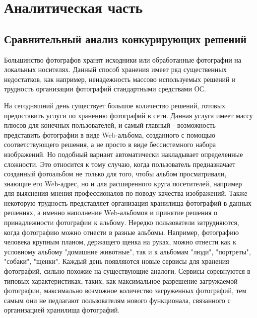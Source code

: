 \sectioncounter
\section{Аналитическая часть}\label{analytics}

\subsection{Сравнительный анализ конкурирующих решений} \label{comparsion}

Большинство фотографов хранят исходники или обработанные фотографии на локальных носителях.
Данный способ хранения имеет ряд существенных недостатков, как например, ненадежность массово используемых решений и трудность организации фотографий стандартными средствами ОС.

На сегодняшний день существует большое количество решений, готовых предоставить услуги по хранению фотографий в сети.
Данная услуга имеет массу плюсов для конечных пользователей, и самый главный  - возможность представить фотографии в виде Web-альбома, созданного с помощью соответствующего решения, а не просто в виде бессистемного набора изображений.
Но подобный вариант автоматически накладывает определенные сложности. 
Это относится к тому случаю, когда пользователь предназначает созданный фотоальбом не только для того, чтобы альбом просматривали, знающие его Web-адрес, но и для расширенного круга посетителей, например для выяснения мнения профессионалов по поводу качества изображений.
Также некоторую трудность представляет организация хранилища фотографий в данных решениях, а именно наполнение Web-альбомов и принятие решения о принадлежности фотографии к альбому. 
Нередко пользователи затрудняются, когда фотографию можно отнести в разные альбомы. Например, фотографию человека крупным планом, держащего щенка на руках, можно отнести как к условному альбому "домашние животные", так и к альбомам "люди", "портреты", "собаки", "щенки".
Каждый день появляются новые сервисы для хранения фотографий, сильно похожие на существующие аналоги.
Сервисы соревнуются в типовых характеристиках, таких, как максимальное разрешение загружаемой фотографии, максимально возможное количество загруженных фотографий, тем самым они не педлагают пользователям нового функционала, связанного с организацией хранилища фотографий.

